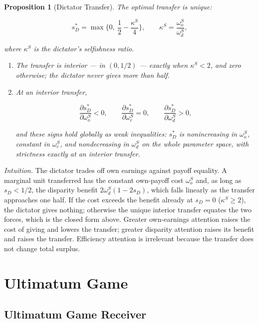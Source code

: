 \documentclass[11pt]{article}
\theoremstyle{plain}
\newtheorem{proposition}{Proposition}
\theoremstyle{remark}
\begin{document}
\begin{proposition}[Dictator Transfer]
\label{prop:dictator}
The optimal transfer is unique:
\begin{csbox}
\[
        s_D^\ast=\max\Big\{0,\ \frac12-\frac{\kappa^S}{4}\Big\},
        \qquad
        \kappa^S=\frac{\omega_o^S}{\omega_d^S},
\]
\end{csbox}
where $\kappa^S$ is the dictator's \emph{selfishness ratio}.
\begin{enumerate}[topsep=2pt,itemsep=2pt]
\item The transfer is interior --- in $(0,1/2)$ --- exactly when $\kappa^S<2$, and zero otherwise; the dictator never gives more than half.
\item At an interior transfer,
\begin{csbox}
\[
        \frac{\partial s_D^\ast}{\partial \omega_o^S}<0,
        \qquad
        \frac{\partial s_D^\ast}{\partial \omega_e^S}=0,
        \qquad
        \frac{\partial s_D^\ast}{\partial \omega_d^S}>0,
\]
\end{csbox}
and these signs hold globally as weak inequalities: $s_D^\ast$ is nonincreasing in $\omega_o^S$, constant in $\omega_e^S$, and nondecreasing in $\omega_d^S$ on the whole parameter space, with strictness exactly at an interior transfer.
\end{enumerate}
\end{proposition}

\noindent\emph{Intuition.}  The dictator trades off own earnings against payoff equality.  A marginal unit transferred has the constant own-payoff cost $\omega_o^S$ and, as long as $s_D<1/2$, the disparity benefit $2\omega_d^S(1-2s_D)$, which falls linearly as the transfer approaches one half.  If the cost exceeds the benefit already at $s_D=0$ ($\kappa^S\ge2$), the dictator gives nothing; otherwise the unique interior transfer equates the two forces, which is the closed form above.  Greater own-earnings attention raises the cost of giving and lowers the transfer; greater disparity attention raises its benefit and raises the transfer.  Efficiency attention is irrelevant because the transfer does not change total surplus.

\section{Ultimatum Game}

\subsection{Ultimatum Game Receiver}
\end{document}
